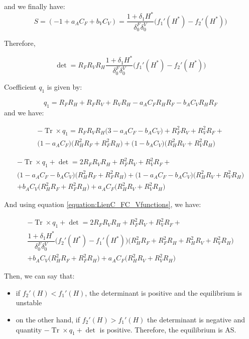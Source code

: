 \documentclass{article}
\newcommand{\df}{\delta_0^F}
\newcommand{\dv}{\delta_0^V}
\DeclareMathOperator{\Tr}{Tr}
\begin{document}
and we finally have:
\begin{equation}
S = \left(-1 + a_A C_F + b_V C_V \right)  =  \dfrac{1 + \delta_1 H^*}{\df \dv}\Big(f_1'(H^*) - f_2'(H^*)\Big)
\label{equation:LienC_FC_Vfunctions}
\end{equation}

Therefore, 

$$
\det = R_FR_VR_H \dfrac{1 + \delta_1 H^*}{\df \dv}\Big(f_1'(H^*) - f_2'(H^*)\Big)
$$


Coefficient $q_1$ is given by:

$$
q_1 = R_F R_H + R_F R_V + R_V R_H - a_A C_F R_H R_F - b_A C_V R_H R_F
$$
and we have:


\begin{multline*}
-\Tr \times q_1 = R_F R_V R_H\Big(3 -a_A C_F- b_AC_V \Big) + R_F^2R_V + R_V^2 R_F +\\
\Big(1 - a_A C_F\Big) \Big(R_H^2 R_F + R_F^2 R_H \Big) +
\Big(1 - b_A C_V\Big) \Big(R_H^2 R_V + R_V^2 R_H \Big)
\end{multline*}

\begin{multline*}
-\Tr \times q_1 + \det = 2 R_F R_V R_H + R_F^2R_V + R_V^2 R_F +\\
\Big(1 - a_A C_F - b_A C_V \Big) \Big(R_H^2 R_F + R_F^2 R_H \Big) +
\Big(1 - a_A C_F - b_A C_V\Big) \Big(R_H^2 R_V + R_V^2 R_H \Big) \\ + b_A C_V \Big(R_H^2 R_F + R_F^2 R_H \Big) + a_A C_F \Big(R_H^2 R_V + R_V^2 R_H \Big)
\end{multline*}

And using equation \eqref{equation:LienC_FC_Vfunctions}, we have:

\begin{multline*}
-\Tr \times q_1 + \det = 2 R_F R_V R_H + R_F^2R_V + R_V^2 R_F +\\
\dfrac{1 + \delta_1 H^*}{\df \dv} \Big(f_2'(H^*) - f_1'(H^*)\Big) \Big(R_H^2 R_F + R_F^2 R_H + R_H^2 R_V + R_V^2 R_H\Big)  \\ + b_A C_V \Big(R_H^2 R_F + R_F^2 R_H \Big) + a_A C_F \Big(R_H^2 R_V + R_V^2 R_H \Big)
\end{multline*}


Then, we can say that:
\begin{itemize}
\item if $f_2'(H) < f_1'(H)$, the determinant is positive and the equilibrium is unstable
\item on the other hand, if $f_2'(H) > f_1'(H)$ the determinant is negative and quantity $-\Tr \times q_1 + \det$ is positive. Therefore, the equilibrium is AS.
\end{itemize}
\end{document}
